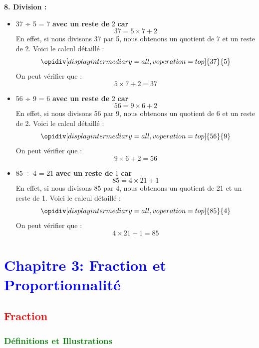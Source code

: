 \documentclass{article}
\begin{document}
\begin{tcolorbox}[colback=green!10!white, colframe=green!75!black, sharp corners=south, boxrule=0.8mm, title=Corrections]

    \textbf{8. Division :}
    \begin{itemize}
        \item 37 ÷ 5 = 7 \textbf{ avec un reste de } 2 \textbf{ car } 
        \[
        37 = 5 \times 7 + 2
        \]
        En effet, si nous divisons 37 par 5, nous obtenons un quotient de 7 et un reste de 2. Voici le calcul détaillé :
        \[
        \opidiv[displayintermediary=all,voperation=top]{37}{5}
        \]
        On peut vérifier que :
        \[
        5 \times 7 + 2 = 37
        \]
        \item 56 ÷ 9 = 6 \textbf{ avec un reste de } 2 \textbf{ car }
        \[
        56 = 9 \times 6 + 2
        \]
        En effet, si nous divisons 56 par 9, nous obtenons un quotient de 6 et un reste de 2. Voici le calcul détaillé :
        \[
        \opidiv[displayintermediary=all,voperation=top]{56}{9}
        \]
        On peut vérifier que :
        \[
        9 \times 6 + 2 = 56
        \]

        \item 85 ÷ 4 = 21 \textbf{ avec un reste de } 1 \textbf{ car }
        \[
        85 = 4 \times 21 + 1
        \]
        En effet, si nous divisons 85 par 4, nous obtenons un quotient de 21 et un reste de 1. Voici le calcul détaillé :
        \[
        \opidiv[displayintermediary=all,voperation=top]{85}{4}
        \]
        On peut vérifier que :
        \[
        4 \times 21 + 1 = 85
        \]
    \end{itemize}
\end{tcolorbox}
\newpage

\section{\textcolor{blue}{Chapitre 3: Fraction et Proportionnalité}}

\subsection{\textcolor{red}{Fraction}}
\subsubsection{\textcolor{green}{Définitions et Illustrations}}

\vspace{0.35cm}
\end{document}
